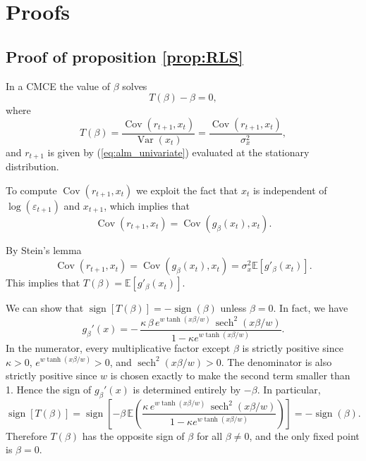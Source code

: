 \documentclass[11pt]{article}
\begin{document}


\appendix
\section{Proofs}
\subsection{Proof of proposition \ref{prop:RLS}}\label{app:proofs}

In a CMCE the value of $\beta$ solves
\begin{equation}
    T(\beta) - \beta = 0,
\end{equation}
where 
\begin{equation}
    T(\beta) = \frac{\operatorname{Cov}(r_{t+1}, x_t)}{\operatorname{Var}(x_t)} = \frac{\operatorname{Cov}(r_{t+1}, x_t)}{\sigma^2_x},
\end{equation}
and $r_{t+1}$ is given by (\ref{eq:alm_univariate}) evaluated at the stationary distribution.

To compute $\operatorname{Cov}(r_{t+1}, x_t)$ we exploit the fact that $x_t$ is independent of $\log(\varepsilon_{t+1})$ and $x_{t+1}$, which implies that
\begin{equation}
    \operatorname{Cov}(r_{t+1}, x_t) = \operatorname{Cov}\left(g_{\beta}(x_t), x_t\right).
\end{equation}

By Stein's lemma
\begin{equation}
    \operatorname{Cov}(r_{t+1}, x_t) = \operatorname{Cov}(g_{\beta}(x_t), x_t) = \sigma^2_x \mathbb{E}\left[g'_{\beta}(x_t)\right].
\end{equation}
This implies that $T(\beta) = \mathbb{E}\left[g'_{\beta}(x_t)\right]$.

We can show that  $\operatorname{sign}\left[T(\beta)\right] = - \operatorname{sign}(\beta)$ unless $\beta = 0$. In fact, we have
\begin{equation}
    g_{\beta}'(x)
= -\,\frac{\kappa\,\beta\, e^{w\tanh(x \beta/w)}\, \operatorname{sech}^2(x \beta/w)}
        {1 - \kappa e^{w\tanh(x \beta/w)}}.
\end{equation}
In the numerator, every multiplicative factor except $\beta$ is strictly positive since
$\kappa>0$, $e^{w\tanh(x \beta/w)}>0$, and $\operatorname{sech}^2(x \beta/w)>0$.
The denominator is also strictly positive since $w$ is chosen exactly to make the second term smaller than 1.
Hence the sign of $g_\beta'(x)$ is determined entirely by $-\beta$.
In particular,
\begin{equation}
    \operatorname{sign}\left[T(\beta)\right] 
    = \operatorname{sign}\left[ - \beta \,\mathbb{E}\left(\frac{\kappa\, e^{w\tanh(x \beta/w)}\, \operatorname{sech}^2(x \beta/w)}
        {1 - \kappa e^{w\tanh(x \beta/w)}}\right)\right] = - \operatorname{sign}(\beta).
\end{equation}
Therefore $T(\beta)$ has the opposite sign of $\beta$ for all $\beta \neq 0$, and the only fixed point is $\beta = 0$.
\end{document}
